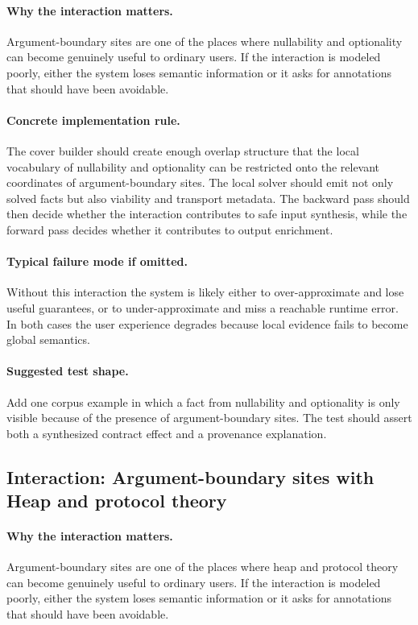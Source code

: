 \documentclass[11pt]{report}
\theoremstyle{definition}
\theoremstyle{plain}
\begin{document}
\paragraph{Why the interaction matters.}
Argument-boundary sites are one of the places where nullability and optionality can become
genuinely useful to ordinary users. If the interaction is modeled poorly,
either the system loses semantic information or it asks for annotations that
should have been avoidable.

\paragraph{Concrete implementation rule.}
The cover builder should create enough overlap structure that the local
vocabulary of nullability and optionality can be restricted onto the relevant
coordinates of argument-boundary sites. The local solver should emit not only
solved facts but also viability and transport metadata. The backward pass
should then decide whether the interaction contributes to safe input
synthesis, while the forward pass decides whether it contributes to output
enrichment.

\paragraph{Typical failure mode if omitted.}
Without this interaction the system is likely either to over-approximate and
lose useful guarantees, or to under-approximate and miss a reachable runtime
error. In both cases the user experience degrades because local evidence
fails to become global semantics.

\paragraph{Suggested test shape.}
Add one corpus example in which a fact from nullability and optionality is only
visible because of the presence of argument-boundary sites. The test should
assert both a synthesized contract effect and a provenance explanation.

\subsection{Interaction: Argument-boundary sites with Heap and protocol theory}

\paragraph{Why the interaction matters.}
Argument-boundary sites are one of the places where heap and protocol theory can become
genuinely useful to ordinary users. If the interaction is modeled poorly,
either the system loses semantic information or it asks for annotations that
should have been avoidable.
\end{document}
